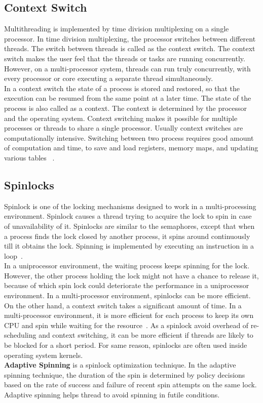 \subsection{Context Switch}
Multithreading is implemented by time division multiplexing on a single processor. In time division multiplexing, the processor switches between different threads. The switch between threads is called as the context switch. The context switch makes the user feel that the threads or tasks are running concurrently. However, on a multi-processor system, threads can run truly concurrently, with every processor or core executing a separate thread simultaneously. 
\\
In a context switch the state of a process is stored and restored, so that the execution can be resumed from the same point at a later time. The state of the process is also called as a context. The context is determined by the processor and the operating system. Context switching makes it possible for multiple processes or threads to share a single processor. Usually context switches are computationally intensive. Switching between two process requires good amount of computation and time, to save and load registers, memory maps, and updating various tables~\cite{Galvin} .

\subsection{Spinlocks}
Spinlock is one of the locking mechanisms designed to work in a multi-processing environment. Spinlock causes a thread trying to acquire the lock to spin in case of unavailability of it. Spinlocks are similar to the semaphores, except that when a process finds the lock closed by another process, it spins around continuously till it obtains the lock. Spinning is implemented by executing an instruction in a loop~\cite{Bovet:2005:ULK:1077084}.
\\[3mm]
In a uniprocessor environment, the waiting process keeps spinning for the lock. However, the other process holding the lock might not have a chance to release it, because of which spin lock could deteriorate the performance in a uniprocessor environment. In a multi-processor environment, spinlocks can be more efficient. On the other hand, a context switch takes a significant amount of time. In a multi-processor environment, it is more efficient for each process to keep its own CPU and spin while waiting for the resource~\cite{Bovet:2005:ULK:1077084}. As a spinlock avoid overhead of re-scheduling and context switching, it can be more efficient if threads are likely to be blocked for a short period. For same reason, spinlocks are often used inside operating system kernels.
\\[3mm]
\textbf{Adaptive Spinning} is a spinlock optimization technique. In the adaptive spinning technique, the duration of the spin is determined by policy decisions based on the rate of success and failure of recent spin attempts on the same lock. Adaptive spinning helps thread to avoid spinning in futile conditions.

